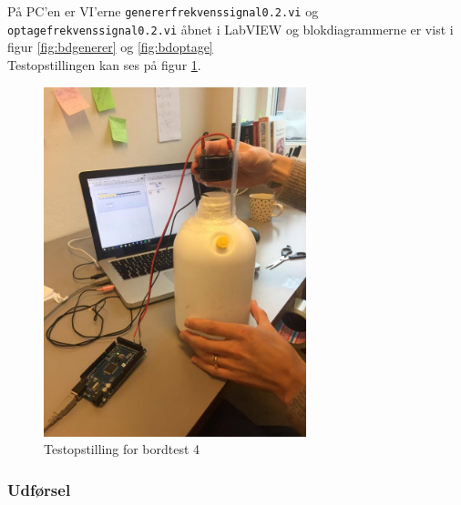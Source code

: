		På PC'en er VI'erne \texttt{genererfrekvenssignal0.2.vi} og \texttt{optagefrekvenssignal0.2.vi} åbnet i LabVIEW og blokdiagrammerne er vist i figur \ref{fig:bdgenerer} og \ref{fig:bdoptage} \\ Testopstillingen kan ses på figur \ref{fig:bt4}.  
		
		\begin{figure}[htb]
			\centering
				\includegraphics[width=3in]{bordtest4}
				\caption{Testopstilling for bordtest 4}	
				\label{fig:bt4}
			\end{figure}
		

		
		\subsubsection{Udførsel}
			
